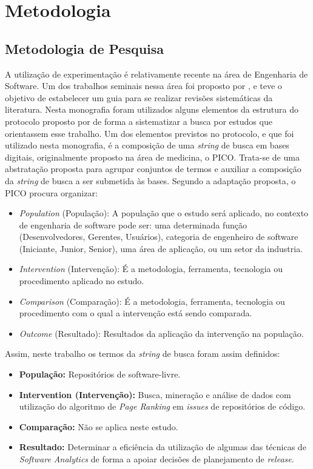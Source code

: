 \chapter{Metodologia}
\label{met}
\section{Metodologia de Pesquisa}
\label{met:pes}

A utilização de experimentação é relativamente recente na área de Engenharia de Software. Um dos trabalhos seminais nessa área foi proposto por , e teve o objetivo de estabelecer um guia para se realizar revisões sistemáticas da literatura. Nesta monografia foram utilizados alguns elementos da estrutura do protocolo proposto por  de forma a sistematizar a busca por estudos que orientassem esse trabalho. Um dos elementos previstos no protocolo, e que foi utilizado nesta monografia, é a composição de uma \textit{string} de busca em bases digitais, originalmente proposto na área de medicina, o PICO. \cite{citeulike:10757239} Trata-se de uma abstratação proposta para agrupar conjuntos de termos e auxiliar a composição da \textit{string} de busca a ser submetida às bases. Segundo a adaptação proposta, o PICO procura organizar:

\begin{itemize}
    \item \textit{Population} (População): A população que o estudo será aplicado, no contexto de engenharia de software pode ser: uma determinada função (Desenvolvedores, Gerentes, Usuários), categoria de engenheiro de software (Iniciante, Junior, Senior), uma área de aplicação, ou um setor da industria.
    \item \textit{Intervention} (Intervenção): É a metodologia, ferramenta, tecnologia ou procedimento aplicado no estudo.
    \item \textit{Comparison} (Comparação): É a metodologia, ferramenta, tecnologia ou procedimento com o qual a intervenção está sendo comparada.
    \item \textit{Outcome} (Resultado): Resultados da aplicação da intervenção na população.
\end{itemize}

Assim, neste trabalho os termos da \textit{string} de busca foram assim definidos:

\begin{itemize}
    \item \textbf{População:} Repositórios de software-livre.
    \item \textbf{Intervention (Intervenção):} Busca, mineração e análise de dados com utilização do algoritmo de \textit{Page Ranking} em \textit{issues} de repositórios de código.
    \item \textbf{Comparação:} Não se aplica neste estudo.
    \item \textbf{Resultado:} Determinar a eficiência da utilização de algumas das técnicas de \textit{Software Analytics} de forma a apoiar decisões de planejamento de \textit{release}.
\end{itemize}


